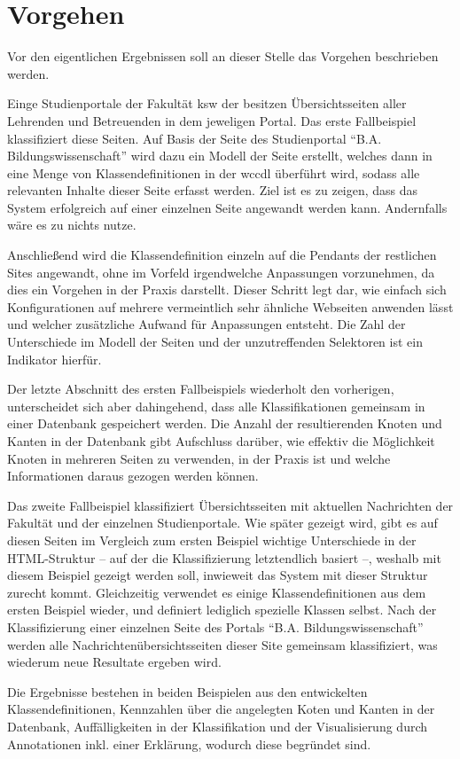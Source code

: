 \section{Vorgehen}
    Vor den eigentlichen Ergebnissen soll an dieser Stelle
    das Vorgehen beschrieben werden.

    Einge Studienportale der Fakultät \gls{ksw} der {\fernUni}
    besitzen Übersichtsseiten aller Lehrenden und Betreuenden
    in dem jeweligen Portal.
    Das erste Fallbeispiel klassifiziert diese Seiten.
    Auf Basis der Seite des Studienportal "`B.A. Bildungswissenschaft"'
    wird dazu ein Modell der Seite erstellt,
    welches dann in eine Menge von Klassendefinitionen in der \gls{wccdl} überführt wird,
    sodass alle relevanten Inhalte dieser Seite erfasst werden.
    Ziel ist es zu zeigen, dass das System erfolgreich auf einer einzelnen Seite angewandt werden kann.
    Andernfalls wäre es zu nichts nutze.

    Anschließend wird die Klassendefinition einzeln auf die Pendants der restlichen Sites angewandt,
    ohne im Vorfeld irgendwelche Anpassungen vorzunehmen,
    da dies ein Vorgehen in der Praxis darstellt.
    Dieser Schritt legt dar, wie einfach sich Konfigurationen auf mehrere vermeintlich
    sehr ähnliche Webseiten anwenden lässt und welcher zusätzliche Aufwand für Anpassungen entsteht.
    Die Zahl der Unterschiede im Modell der Seiten und der unzutreffenden Selektoren ist ein Indikator hierfür.

    Der letzte Abschnitt des ersten Fallbeispiels wiederholt den vorherigen,
    unterscheidet sich aber dahingehend, dass alle Klassifikationen
    gemeinsam in einer Datenbank gespeichert werden.
    Die Anzahl der resultierenden Knoten und Kanten in der Datenbank
    gibt Aufschluss darüber, wie effektiv die Möglichkeit Knoten in mehreren Seiten
    zu verwenden, in der Praxis ist und welche Informationen daraus gezogen werden können.

    Das zweite Fallbeispiel klassifiziert Übersichtsseiten mit aktuellen Nachrichten
    der Fakultät und der einzelnen Studienportale.
    Wie später gezeigt wird, gibt es auf diesen Seiten im Vergleich zum ersten Beispiel
    wichtige Unterschiede in der HTML-Struktur -- auf der die Klassifizierung letztendlich basiert --,
    weshalb mit diesem Beispiel gezeigt werden soll, inwieweit das System mit dieser Struktur zurecht kommt.
    Gleichzeitig verwendet es einige Klassendefinitionen aus dem ersten Beispiel wieder,
    und definiert lediglich spezielle Klassen selbst.
    Nach der Klassifizierung einer einzelnen Seite des Portals "`B.A. Bildungswissenschaft"'
    werden alle Nachrichtenübersichtsseiten dieser Site gemeinsam klassifiziert,
    was wiederum neue Resultate ergeben wird.

    Die Ergebnisse bestehen in beiden Beispielen aus
    den entwickelten Klassendefinitionen,
    Kennzahlen über die angelegten Koten und Kanten in der Datenbank,
    Auffälligkeiten in der Klassifikation und der Visualisierung durch Annotationen
    inkl. einer Erklärung, wodurch diese begründet sind.
